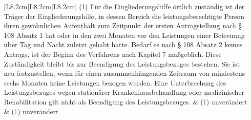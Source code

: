 \documentclass[10pt,a4paper,landscape]{article}
\begin{document}
\begin{longtable}{|L{8.2cm}|L{8.2cm}|L{8.2cm}|}
\hhline{|---|}
(1) Für die Eingliederungshilfe örtlich  \newline zuständig ist der Träger der  \newline Eingliederungshilfe, in dessen Bereich die  \newline leistungsberechtigte Person ihren  \newline gewöhnlichen Aufenthalt zum Zeitpunkt der  \newline ersten Antragstellung nach \S{} 108 Absatz 1  \newline hat oder in den zwei Monaten vor den  \newline Leistungen einer Betreuung über Tag und  \newline Nacht zuletzt gehabt hatte. Bedarf es nach  \newline \S{} 108 Absatz 2 keines Antrags, ist der  \newline Beginn des Verfahrens nach Kapitel 7  \newline maßgeblich. Diese Zuständigkeit bleibt bis  \newline zur Beendigung des Leistungsbezuges  \newline bestehen. Sie ist neu festzustellen, wenn  \newline für einen zusammenhängenden Zeitraum  \newline von mindestens sechs Monaten keine  \newline Leistungen bezogen wurden. Eine  \newline Unterbrechung des Leistungsbezuges  \newline wegen stationärer  \newline Krankenhausbehandlung oder  \newline medizinischer Rehabilitation gilt nicht als  \newline Beendigung des Leistungsbezuges. & (1) unverändert & (1) unverändert \\
\hhline{|---|}

\end{longtable}
\end{document}
